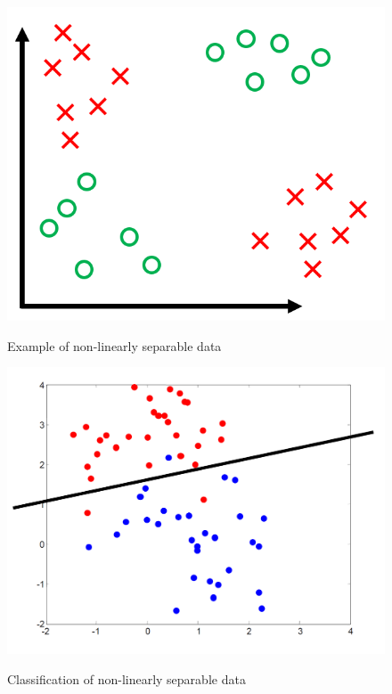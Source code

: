 \documentclass[10pt,twocolumn,a4paper]{article}
\begin{document}
\begin{figure}
    \centering
    \includegraphics[width=1\linewidth]{non-linearly-separable.png}
    \caption{Example of non-linearly separable data} \cite{perceptron-lecture}
    \label{fig:non-linearly-separable}
\end{figure}

\begin{figure}
    \centering
    \includegraphics[width=1\linewidth]{non-linearly-separable2.png}
    \caption{Classification of non-linearly separable data }\cite{linClassify-lecture}
    \label{fig:non-linearly-separable-2}
\end{figure}
\end{document}
